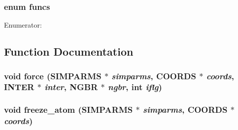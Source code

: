 \subsubsection{\setlength{\rightskip}{0pt plus 5cm}enum {\bf funcs}}\label{md__fcntr_8c_365f9b159538e6a24e7a578f57903f72}


\begin{Desc}
\item[Enumerator: ]\par
\begin{description}
\item[{\em 
BOND\label{md__fcntr_8c_365f9b159538e6a24e7a578f57903f72173a95f5ec8cbbebfdc6c651cdea6a96}
}]\item[{\em 
BEND\label{md__fcntr_8c_365f9b159538e6a24e7a578f57903f7209a00e8938ffe5ec3f8441dc445cd5d3}
}]\item[{\em 
XBOND\label{md__fcntr_8c_365f9b159538e6a24e7a578f57903f72308d04dbf6a985a97c095fd0da1f9338}
}]\end{description}
\end{Desc}



\subsection{Function Documentation}
\subsubsection{\setlength{\rightskip}{0pt plus 5cm}void force ({\bf SIMPARMS} $\ast$ {\em simparms}, {\bf COORDS} $\ast$ {\em coords}, {\bf INTER} $\ast$ {\em inter}, {\bf NGBR} $\ast$ {\em ngbr}, int {\em iflg})}\label{md__fcntr_8c_d9bc982af2ea532bf7ae40c770af2eb3}


\subsubsection{\setlength{\rightskip}{0pt plus 5cm}void freeze\_\-atom ({\bf SIMPARMS} $\ast$ {\em simparms}, {\bf COORDS} $\ast$ {\em coords})}\label{md__fcntr_8c_f13bb37b9531da8c75e42f33543ffb2a}


